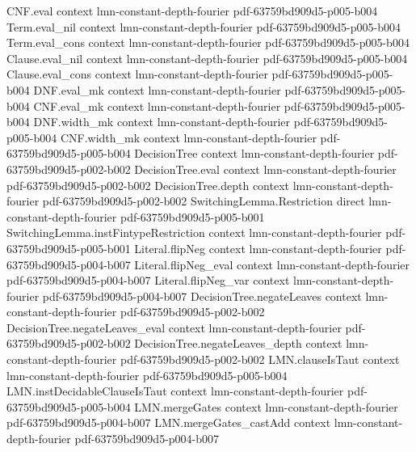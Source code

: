 \begin{lemma}
  {CNF.eval}
  {context}
  {lmn-constant-depth-fourier}
  {pdf-63759bd909d5-p005-b004}
\proofstep
  {Term.eval_nil}
  {context}
  {lmn-constant-depth-fourier}
  {pdf-63759bd909d5-p005-b004}
\proofstep
  {Term.eval_cons}
  {context}
  {lmn-constant-depth-fourier}
  {pdf-63759bd909d5-p005-b004}
\proofstep
  {Clause.eval_nil}
  {context}
  {lmn-constant-depth-fourier}
  {pdf-63759bd909d5-p005-b004}
\proofstep
  {Clause.eval_cons}
  {context}
  {lmn-constant-depth-fourier}
  {pdf-63759bd909d5-p005-b004}
\proofstep
  {DNF.eval_mk}
  {context}
  {lmn-constant-depth-fourier}
  {pdf-63759bd909d5-p005-b004}
\proofstep
  {CNF.eval_mk}
  {context}
  {lmn-constant-depth-fourier}
  {pdf-63759bd909d5-p005-b004}
\proofstep
  {DNF.width_mk}
  {context}
  {lmn-constant-depth-fourier}
  {pdf-63759bd909d5-p005-b004}
\proofstep
  {CNF.width_mk}
  {context}
  {lmn-constant-depth-fourier}
  {pdf-63759bd909d5-p005-b004}
\proofstep
  {DecisionTree}
  {context}
  {lmn-constant-depth-fourier}
  {pdf-63759bd909d5-p002-b002}
\proofstep
  {DecisionTree.eval}
  {context}
  {lmn-constant-depth-fourier}
  {pdf-63759bd909d5-p002-b002}
\proofstep
  {DecisionTree.depth}
  {context}
  {lmn-constant-depth-fourier}
  {pdf-63759bd909d5-p002-b002}
\proofstep
  {SwitchingLemma.Restriction}
  {direct}
  {lmn-constant-depth-fourier}
  {pdf-63759bd909d5-p005-b001}
\proofstep
  {SwitchingLemma.instFintypeRestriction}
  {context}
  {lmn-constant-depth-fourier}
  {pdf-63759bd909d5-p005-b001}
\proofstep
  {Literal.flipNeg}
  {context}
  {lmn-constant-depth-fourier}
  {pdf-63759bd909d5-p004-b007}
\proofstep
  {Literal.flipNeg_eval}
  {context}
  {lmn-constant-depth-fourier}
  {pdf-63759bd909d5-p004-b007}
\proofstep
  {Literal.flipNeg_var}
  {context}
  {lmn-constant-depth-fourier}
  {pdf-63759bd909d5-p004-b007}
\proofstep
  {DecisionTree.negateLeaves}
  {context}
  {lmn-constant-depth-fourier}
  {pdf-63759bd909d5-p002-b002}
\proofstep
  {DecisionTree.negateLeaves_eval}
  {context}
  {lmn-constant-depth-fourier}
  {pdf-63759bd909d5-p002-b002}
\proofstep
  {DecisionTree.negateLeaves_depth}
  {context}
  {lmn-constant-depth-fourier}
  {pdf-63759bd909d5-p002-b002}
\proofstep
  {LMN.clauseIsTaut}
  {context}
  {lmn-constant-depth-fourier}
  {pdf-63759bd909d5-p005-b004}
\proofstep
  {LMN.instDecidableClauseIsTaut}
  {context}
  {lmn-constant-depth-fourier}
  {pdf-63759bd909d5-p005-b004}
\proofstep
  {LMN.mergeGates}
  {context}
  {lmn-constant-depth-fourier}
  {pdf-63759bd909d5-p004-b007}
\proofstep
  {LMN.mergeGates_castAdd}
  {context}
  {lmn-constant-depth-fourier}
  {pdf-63759bd909d5-p004-b007}
\proofstep

\end{lemma}
